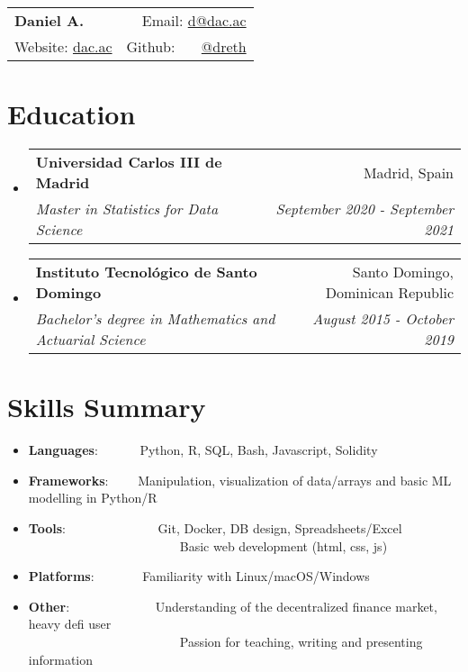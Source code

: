 \documentclass[a4paper,20pt]{article}
\makeatletter
\newcommand{\resumeItem}[2]{
  \item\small{
    \textbf{#1}{: #2 \vspace{-2pt}}
  }
}
\newcommand{\resumeSubheading}[4]{
  \vspace{-1pt}\item
    \begin{tabular*}{0.97\textwidth}{l@{\extracolsep{\fill}}r}
      \textbf{#1} & #2 \\
      \textit{#3} & \textit{#4} \\
    \end{tabular*}\vspace{-5pt}
}
\newcommand{\resumeSubItem}[2]{\resumeItem{#1}{#2}\vspace{-3pt}}
\newcommand{\resumeSubHeadingListStart}{\begin{itemize}[leftmargin=*]}
\newcommand{\resumeSubHeadingListEnd}{\end{itemize}}
\makeatother
\begin{document}
\begin{tabular*}{\textwidth}{l@{\extracolsep{\fill}}r}
  \textbf{{\LARGE Daniel A.}} & Email: {\color{blue}\href{mailto:}{d@dac.ac}}\\
  Website: {\color{blue}\href{https://dac.ac}{dac.ac}} & Github: ~~~{\color{blue}\href{https://github.com/dreth}{@dreth}}
\end{tabular*}




            
\vspace{-4pt}
\section{Education}
\resumeSubHeadingListStart
        
  \resumeSubheading
    {Universidad Carlos III de Madrid}{Madrid, Spain}
    {Master in Statistics for Data Science}{September 2020 - September 2021}
\vspace{-2pt}
  \resumeSubheading
    {Instituto Tecnológico de Santo Domingo}{Santo Domingo, Dominican Republic}
    {Bachelor's degree in Mathematics and Actuarial Science}{August 2015 - October 2019}
\resumeSubHeadingListEnd


            
\vspace{-7pt}
\section{Skills Summary}
  \resumeSubHeadingListStart
            
        
\vspace{-2pt}
\resumeSubItem{Languages}{~~~~~~Python, R, SQL, Bash, Javascript, Solidity}
\vspace{-2pt}
\resumeSubItem{Frameworks}{~~~~Manipulation, visualization of data/arrays and basic ML modelling in Python/R}
\vspace{-2pt}
\resumeSubItem{Tools}{~~~~~~~~~~~~~~Git, Docker, DB design, Spreadsheets/Excel\\~~~~~~~~~~~~~~~~~~~~~~~~Basic web development (html, css, js)}
\vspace{-2pt}
\resumeSubItem{Platforms}{~~~~~~~Familiarity with Linux/macOS/Windows}
\vspace{-2pt}
\resumeSubItem{Other}{~~~~~~~~~~~~~Understanding of the decentralized finance market, heavy defi user\\~~~~~~~~~~~~~~~~~~~~~~~~Passion for teaching, writing and presenting information}
\resumeSubHeadingListEnd
\end{document}
